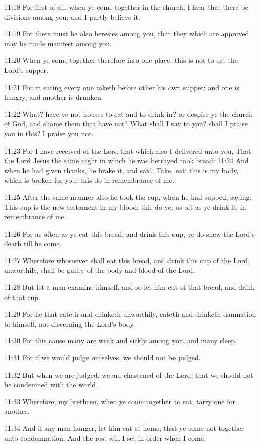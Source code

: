 11:18 For first of all, when ye come together in the church, I hear that there be divisions among you; and I partly believe it.

11:19 For there must be also heresies among you, that they which are approved may be made manifest among you.

11:20 When ye come together therefore into one place, this is not to eat the Lord's supper.

11:21 For in eating every one taketh before other his own supper: and one is hungry, and another is drunken.

11:22 What? have ye not houses to eat and to drink in? or despise ye the church of God, and shame them that have not? What shall I say to you? shall I praise you in this? I praise you not.

11:23 For I have received of the Lord that which also I delivered unto you, That the Lord Jesus the same night in which he was betrayed took bread: 11:24 And when he had given thanks, he brake it, and said, Take, eat: this is my body, which is broken for you: this do in remembrance of me.

11:25 After the same manner also he took the cup, when he had supped, saying, This cup is the new testament in my blood: this do ye, as oft as ye drink it, in remembrance of me.

11:26 For as often as ye eat this bread, and drink this cup, ye do shew the Lord's death till he come.

11:27 Wherefore whosoever shall eat this bread, and drink this cup of the Lord, unworthily, shall be guilty of the body and blood of the Lord.

11:28 But let a man examine himself, and so let him eat of that bread, and drink of that cup.

11:29 For he that eateth and drinketh unworthily, eateth and drinketh damnation to himself, not discerning the Lord's body.

11:30 For this cause many are weak and sickly among you, and many sleep.

11:31 For if we would judge ourselves, we should not be judged.

11:32 But when we are judged, we are chastened of the Lord, that we should not be condemned with the world.

11:33 Wherefore, my brethren, when ye come together to eat, tarry one for another.

11:34 And if any man hunger, let him eat at home; that ye come not together unto condemnation. And the rest will I set in order when I come.

